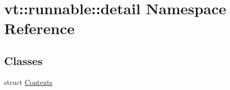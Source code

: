 \hypertarget{namespacevt_1_1runnable_1_1detail}{}\section{vt\+:\+:runnable\+:\+:detail Namespace Reference}
\label{namespacevt_1_1runnable_1_1detail}
\subsection*{Classes}
\begin{DoxyCompactItemize}
\item 
struct \hyperlink{structvt_1_1runnable_1_1detail_1_1_contexts}{Contexts}
\end{DoxyCompactItemize}
